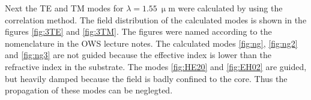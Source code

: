 Next the TE and TM modes for $\lambda = 1.55~\upmu$m were calculated by using the correlation method. The field distribution of the calculated modes is shown in the figures \ref{fig:3TE} and \ref{fig:3TM}. The figures were named according to the nomenclature in the OWS lecture notes. The calculated modes \ref{fig:ng}, \ref{fig:ng2} and \ref{fig:ng3} are not guided because the effective index is lower than the refractive index in the substrate. The modes \ref{fig:HE20} and \ref{fig:EH02} are guided, but heavily damped because the field is badly confined to the core. Thus the propagation of these modes can be neglegted.


\begin{figure}%
\centering
	\\%

\end{figure}
